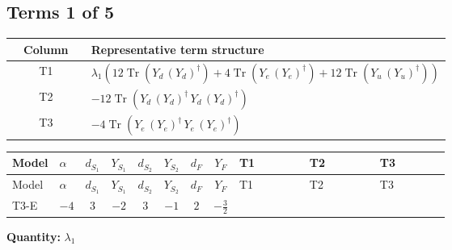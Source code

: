 \documentclass[8pt]{article}
\begin{document}
\begin{landscape}
\subsection*{Terms 1 of 5}
\begin{center}
\begin{tabular}{@{}c >{\raggedright\arraybackslash}p{0.82\linewidth}@{}}
\toprule
Column & Representative term structure \\
\midrule
T1 & \(\displaystyle {\lambda_1} (12 \operatorname{Tr}\!\left({Y_d}\,\left({Y_d}\right)^{\dagger}\right)+4 \operatorname{Tr}\!\left({Y_e}\,\left({Y_e}\right)^{\dagger}\right)+12 \operatorname{Tr}\!\left({Y_u}\,\left({Y_u}\right)^{\dagger}\right))\) \\
\midrule
T2 & \(\displaystyle -12 \operatorname{Tr}\!\left({Y_d}\,\left({Y_d}\right)^{\dagger}\,{Y_d}\,\left({Y_d}\right)^{\dagger}\right)\) \\
\midrule
T3 & \(\displaystyle -4 \operatorname{Tr}\!\left({Y_e}\,\left({Y_e}\right)^{\dagger}\,{Y_e}\,\left({Y_e}\right)^{\dagger}\right)\) \\
\midrule
\bottomrule
\end{tabular}
\end{center}
\smallskip
\tiny
\begin{longtable}{@{}llcccccc >{\raggedright\arraybackslash}p{0.21\linewidth} >{\raggedright\arraybackslash}p{0.21\linewidth} >{\raggedright\arraybackslash}p{0.21\linewidth}@{}}
\toprule
Model & $\alpha$ & $d_{S_1}$ & $Y_{S_1}$ & $d_{S_2}$ & $Y_{S_2}$ & $d_F$ & $Y_F$ & T1 & T2 & T3 \\
\midrule
\endfirsthead
\toprule
Model & $\alpha$ & $d_{S_1}$ & $Y_{S_1}$ & $d_{S_2}$ & $Y_{S_2}$ & $d_F$ & $Y_F$ & T1 & T2 & T3 \\
\midrule
\endhead
T3-E & $-4$ & $3$ & $-2$ & $3$ & $-1$ & $2$ & $-\frac{3}{2}$ & \scriptsize\adjustbox{max width=\linewidth}{$\begin{gathered} {\lambda_1} (12 \operatorname{Tr}\!\left({Y_d}\,\left({Y_d}\right)^{\dagger}\right)+4 \operatorname{Tr}\!\left({Y_e}\,\left({Y_e}\right)^{\dagger}\right)+12 \operatorname{Tr}\!\left({Y_u}\,\left({Y_u}\right)^{\dagger}\right))\end{gathered}$} & \scriptsize\adjustbox{max width=\linewidth}{$\begin{gathered} -12 \operatorname{Tr}\!\left({Y_d}\,\left({Y_d}\right)^{\dagger}\,{Y_d}\,\left({Y_d}\right)^{\dagger}\right)\end{gathered}$} & \scriptsize\adjustbox{max width=\linewidth}{$\begin{gathered} -4 \operatorname{Tr}\!\left({Y_e}\,\left({Y_e}\right)^{\dagger}\,{Y_e}\,\left({Y_e}\right)^{\dagger}\right)\end{gathered}$} \\
\midrule
\bottomrule
\end{longtable}
\clearpage
\noindent\textbf{Quantity: }$\lambda_1$\par\smallskip

\end{landscape}
\end{document}
